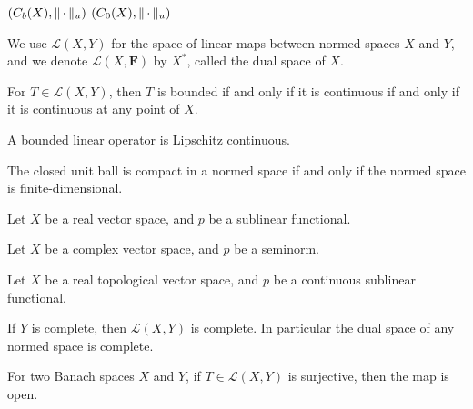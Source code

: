 \begin{exa}
    $(C_b(X),\lVert \,\cdot\, \rVert_u)$
    $(C_0(X),\lVert \,\cdot\, \rVert_u)$
\end{exa}

We use $\mathcal{L}(X,Y)$ for the space of linear maps between normed spaces $X$ and $Y$, and we denote $\mathcal L(X,\mathbf F)$ by $X^*$, called the dual space of $X$.
\begin{prop}
    For $T \in \mathcal{L}(X,Y)$, then $T$ is bounded if and only if it is continuous if and only if it is continuous at any point of $X$.
\end{prop}

\begin{fact}
    A bounded linear operator is Lipschitz continuous.
\end{fact}

\begin{namedthm}
    
\end{namedthm}

\begin{thm}
    The closed unit ball is compact in a normed space if and only if the normed space is finite-dimensional.
\end{thm}

\begin{namedthm} \label{thm:hahn-banach}
    Let $X$ be a real vector space, and $p$ be a sublinear functional. 

    Let $X$ be a complex vector space, and $p$ be a seminorm.
\end{namedthm}

\begin{namedthm}
    Let $X$ be a real topological vector space, and $p$ be a continuous sublinear functional. 
\end{namedthm}

\begin{prop}
    If $Y$ is complete, then $\mathcal{L}(X,Y)$ is complete. In particular the dual space of any normed space is complete.
\end{prop}

\begin{namedthm}
    
\end{namedthm}

\begin{namedthm}
    For two Banach spaces $X$ and $Y$, if $T\in \mathcal L(X,Y)$ is surjective, then the map is open.
\end{namedthm}

